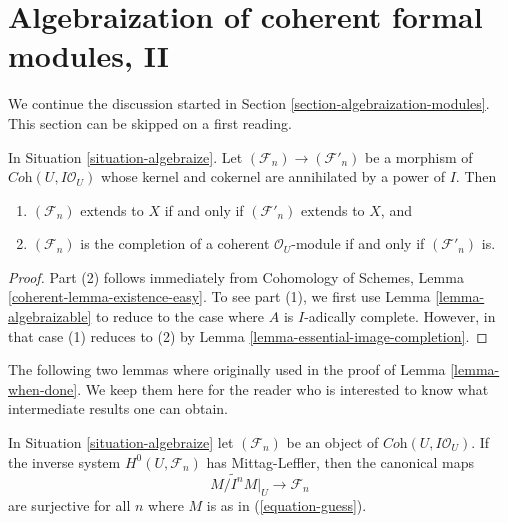\section{Algebraization of coherent formal modules, II}
\label{section-algebraization-modules-general}

\noindent
We continue the discussion started in
Section \ref{section-algebraization-modules}.
This section can be skipped on a first reading.

\begin{lemma}
\label{lemma-map-kernel-cokernel-on-closed}
In Situation \ref{situation-algebraize}. Let
$(\mathcal{F}_n) \to (\mathcal{F}'_n)$ be a morphism of
$\textit{Coh}(U, I\mathcal{O}_U)$
whose kernel and cokernel are annihilated by a power of $I$. Then
\begin{enumerate}
\item $(\mathcal{F}_n)$ extends to $X$ if and only if
$(\mathcal{F}'_n)$ extends to $X$, and
\item $(\mathcal{F}_n)$ is the completion of a coherent $\mathcal{O}_U$-module
if and only if $(\mathcal{F}'_n)$ is.
\end{enumerate}
\end{lemma}

\begin{proof}
Part (2) follows immediately from
Cohomology of Schemes, Lemma \ref{coherent-lemma-existence-easy}.
To see part (1), we first use Lemma \ref{lemma-algebraizable}
to reduce to the case where $A$ is $I$-adically complete.
However, in that case (1) reduces to (2) by
Lemma \ref{lemma-essential-image-completion}.
\end{proof}

\noindent
The following two lemmas where originally used in the proof
of Lemma \ref{lemma-when-done}. We keep them here for the reader who is
interested to know what intermediate results one can obtain.

\begin{lemma}
\label{lemma-when-ML}
In Situation \ref{situation-algebraize} let $(\mathcal{F}_n)$ be an object
of $\textit{Coh}(U, I\mathcal{O}_U)$. If the inverse system
$H^0(U, \mathcal{F}_n)$ has Mittag-Leffler, then the canonical maps
$$
\widetilde{M/I^nM}|_U \to \mathcal{F}_n
$$
are surjective for all $n$ where $M$ is as in (\ref{equation-guess}).
\end{lemma}

